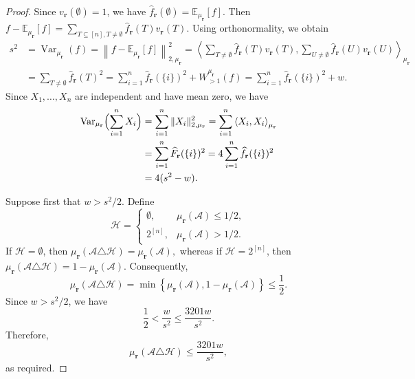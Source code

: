\documentclass[11pt]{article}
\numberwithin{equation}{section}
\theoremstyle{definition}
\theoremstyle{remark}
\begin{document}
\begin{proof}
Since $v_{\mathbf r}(\emptyset)=1$, we have
$
\widehat f_{\mathbf r}(\emptyset)
=
\mathbb E_{\mu_{\mathbf r}}[f].
$
Then
$
f-\mathbb E_{\mu_{\mathbf r}}[f]
=
\sum_{T\subseteq[n], T\neq\emptyset}
\widehat f_{\mathbf r}(T)v_{\mathbf r}(T).
$
Using orthonormality, we obtain
$$
\begin{aligned}
s^2
&=\operatorname{Var}_{\mu_{\mathbf r}}(f)
=
\left\|
f-\mathbb E_{\mu_{\mathbf r}}[f]
\right\|_{2,\mu_{\mathbf r}}^2=
\left\langle
\sum_{T\neq\emptyset}
\widehat f_{\mathbf r}(T)v_{\mathbf r}(T),
\sum_{U\neq\emptyset}
\widehat f_{\mathbf r}(U)v_{\mathbf r}(U)
\right\rangle_{\mu_{\mathbf r}}\\
&=
\sum_{T\neq\emptyset}
\widehat f_{\mathbf r}(T)^2=
\sum_{i=1}^n
\widehat f_{\mathbf r}(\{i\})^2
+
W_{>1}^{\mu_{\mathbf r}}(f)=
\sum_{i=1}^n
\widehat f_{\mathbf r}(\{i\})^2+w.
\end{aligned}
$$
Since  $X_1,\ldots,X_n$ are independent and have mean
zero, we have
\begin{align}
\operatorname{Var}_{\mu_{\mathbf r}}
\Bigl(\sum_{i=1}^nX_i\Bigr)
&=
\sum_{i=1}^n\|X_i\|_{2,\mu_{\mathbf r}}^2=\sum_{i=1}^n\left\langle X_i,X_i\right\rangle_{\mu_{\mathbf r}}\notag\\
&=
\sum_{i=1}^n
\widehat F_{\mathbf r}(\{i\})^2=
4\sum_{i=1}^n
\widehat f_{\mathbf r}(\{i\})^2\notag\\
&=4(s^2-w).\label{af41}
\end{align}



Suppose first that $w>s^2/2$. Define
$$
\mathcal H=
\begin{cases}
\emptyset,
&\mu_{\mathbf r}(\mathcal A)\leq1/2,\\
2^{[n]},
&\mu_{\mathbf r}(\mathcal A)>1/2.
\end{cases}
$$
If $\mathcal H=\emptyset$, then
$
\mu_{\mathbf r}(\mathcal A\triangle\mathcal H)
=
\mu_{\mathbf r}(\mathcal A),
$
whereas if $\mathcal H=2^{[n]}$, then
$
\mu_{\mathbf r}(\mathcal A\triangle\mathcal H)
=
1-\mu_{\mathbf r}(\mathcal A).
$
Consequently,
$$
\mu_{\mathbf r}(\mathcal A\triangle\mathcal H)
=
\min\left\{
\mu_{\mathbf r}(\mathcal A),
1-\mu_{\mathbf r}(\mathcal A)
\right\}
\leq\frac12.
$$
Since $w>s^2/2$, we have
$$
\frac12<\frac{w}{s^2}
\leq\frac{3201w}{s^2}.
$$
Therefore,
$$
\mu_{\mathbf r}(\mathcal A\triangle\mathcal H)
\leq\frac{3201w}{s^2},
$$
as required.


\end{proof}
\end{document}
